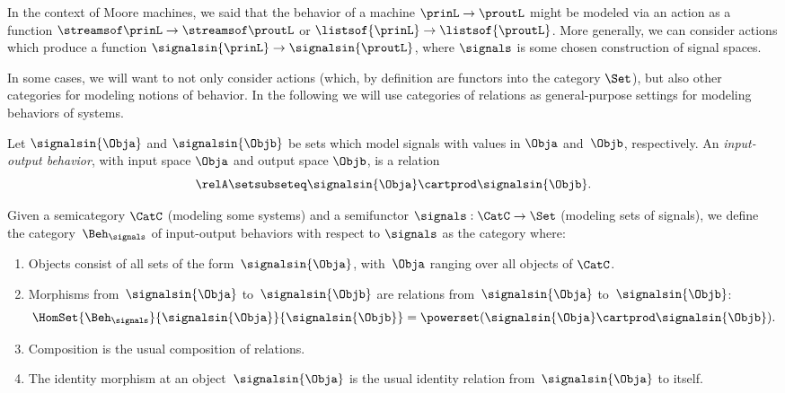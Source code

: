 
In the context of Moore machines, we said that the behavior of a machine $\prinL \to \proutL$ might be modeled via an action as a function $\streamsof\prinL  \to \streamsof\proutL$ or $\listsof{\prinL} \to \listsof{\proutL}$.
More generally, we can consider actions which produce a function $\signalsin{\prinL} \to \signalsin{\proutL}$, where $\signals$ is some chosen construction of signal spaces.

In some cases, we will want to not only consider actions (which, by definition are functors into the category $\Set$), but also other categories for modeling notions of behavior.
In the following we will use categories of relations as general-purpose settings for modeling behaviors of systems.

\begin{definition}
    Let $\signalsin{\Obja}$ and $\signalsin{\Objb}$ be sets which model signals with values in $\Obja$ and~$\Objb$, respectively.
    An \emph{input-output behavior}, with input space $\Obja$ and output space $\Objb$, is a relation
    \begin{equation}
        \relA \setsubseteq \signalsin{\Obja} \cartprod \signalsin{\Objb}.
    \end{equation}
\end{definition}

\begin{definition}
    \label{def:Beh}
    Given a semicategory $\CatC$ (modeling some systems) and a semifunctor $\signals: \CatC \to \Set$ (modeling sets of signals), we define the category~$\Beh_\signals$ of input-output behaviors with respect to $\signals$ as the category where:
    \begin{enumerate}
        \item Objects consist of all sets of the form~$\signalsin{\Obja}$, with~$\Obja$ ranging over all objects of $\CatC$.
        \item Morphisms from~$\signalsin{\Obja}$ to~$\signalsin{\Objb}$ are relations from~$\signalsin{\Obja}$ to~$\signalsin{\Objb}$:
              \begin{equation}
                  \HomSet{\Beh_\signals}{\signalsin{\Obja}}{\signalsin{\Objb}} = \powerset (\signalsin{\Obja} \cartprod \signalsin{\Objb}).
              \end{equation}
        \item Composition is the usual composition of relations.
        \item The identity morphism at an object~$\signalsin{\Obja}$ is the usual identity relation from~$\signalsin{\Obja}$ to itself.
    \end{enumerate}
\end{definition}

